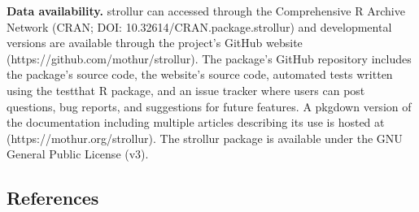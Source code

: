 \documentclass[
  11pt,
]{article}
\begin{document}
\textbf{Data availability.} strollur can accessed through the
Comprehensive R Archive Network (CRAN; DOI:
10.32614/CRAN.package.strollur) and developmental versions are available
through the project's GitHub website
(https://github.com/mothur/strollur). The package's GitHub repository
includes the package's source code, the website's source code, automated
tests written using the testthat R package, and an issue tracker where
users can post questions, bug reports, and suggestions for future
features. A pkgdown version of the documentation including multiple
articles describing its use is hosted at (https://mothur.org/strollur).
The strollur package is available under the GNU General Public License
(v3).

\newpage

\subsection{References}\label{references}
\end{document}
